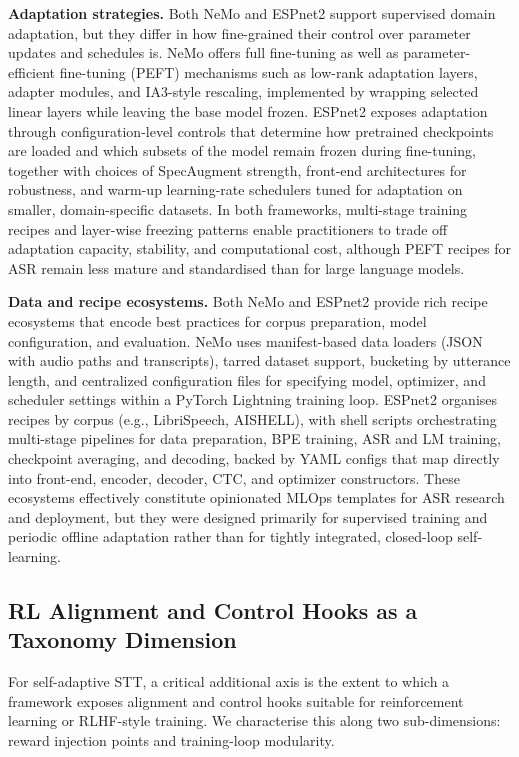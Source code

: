 \documentclass[conference]{IEEEtran}
\begin{document}
\textbf{Adaptation strategies.}
Both NeMo and ESPnet2 support supervised domain adaptation, but they differ in how fine-grained their control over parameter updates and schedules is.
NeMo offers full fine-tuning as well as parameter-efficient fine-tuning (PEFT) mechanisms such as low-rank adaptation layers, adapter modules, and IA3-style rescaling, implemented by wrapping selected linear layers while leaving the base model frozen.
ESPnet2 exposes adaptation through configuration-level controls that determine how pretrained checkpoints are loaded and which subsets of the model remain frozen during fine-tuning, together with choices of SpecAugment strength, front-end architectures for robustness, and warm-up learning-rate schedulers tuned for adaptation on smaller, domain-specific datasets.
In both frameworks, multi-stage training recipes and layer-wise freezing patterns enable practitioners to trade off adaptation capacity, stability, and computational cost, although PEFT recipes for ASR remain less mature and standardised than for large language models.

\textbf{Data and recipe ecosystems.}
Both NeMo and ESPnet2 provide rich recipe ecosystems that encode best practices for corpus preparation, model configuration, and evaluation.
NeMo uses manifest-based data loaders (JSON with audio paths and transcripts), tarred dataset support, bucketing by utterance length, and centralized configuration files for specifying model, optimizer, and scheduler settings within a PyTorch Lightning training loop.
ESPnet2 organises recipes by corpus (e.g., LibriSpeech, AISHELL), with shell scripts orchestrating multi-stage pipelines for data preparation, BPE training, ASR and LM training, checkpoint averaging, and decoding, backed by YAML configs that map directly into front-end, encoder, decoder, CTC, and optimizer constructors.
These ecosystems effectively constitute opinionated MLOps templates for ASR research and deployment, but they were designed primarily for supervised training and periodic offline adaptation rather than for tightly integrated, closed-loop self-learning.

\subsection{RL Alignment and Control Hooks as a Taxonomy Dimension}

For self-adaptive STT, a critical additional axis is the extent to which a framework exposes alignment and control hooks suitable for reinforcement learning or RLHF-style training.
We characterise this along two sub-dimensions: reward injection points and training-loop modularity.
\end{document}
